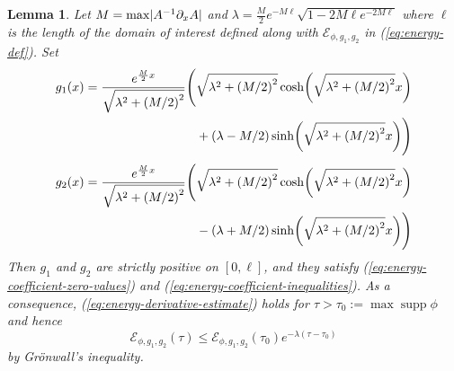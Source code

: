\documentclass[10pt,a4paper]{article}
\theoremstyle{plain}
\newtheorem{lemma}[theorem]{Lemma}
\theoremstyle{definition}
\theoremstyle{remark}
\numberwithin{equation}{section}
\DeclarePairedDelimiter\parentheses{\lparen}{\rparen} %
\DeclarePairedDelimiter\abs{\lvert}{\rvert} %
\newcommand{\supp}{\operatorname{supp}}
\begin{document}
\begin{lemma}\label{gronw-lemma}
  Let $M = \max \abs{A^{-1} \partial_x A}$ and $\lambda = \tfrac{M}{2} e^{-M \ell} \sqrt{1 - 2 M \ell e^{-2 M \ell}}$ where $\ell$ is the length of the domain of interest defined along with $\mathscr{E}_{\phi,g_1,g_2}$ in (\ref{eq:energy-def}). Set
  \begin{align}
    g_1(x) = \frac{e^{\frac{M}{2} x}}{\sqrt{\lambda^2 + \parentheses*{M/2}^2}}
    \Bigg(& \sqrt{\lambda^2 + \parentheses*{M/2}^2} \cosh \parentheses*{\sqrt{\lambda^2 + \parentheses*{M/2}^2} x} \\
          & + \parentheses*{\lambda - M/2} \sinh \parentheses*{\sqrt{\lambda^2 + \parentheses*{M/2}^2} x} \Bigg)
  \end{align}
  \begin{align}
    g_2(x) = \frac{e^{\frac{M}{2} x}}{\sqrt{\lambda^2 + \parentheses*{M/2}^2}}
    \Bigg(& \sqrt{\lambda^2 + \parentheses*{M/2}^2} \cosh \parentheses*{\sqrt{\lambda^2 + \parentheses*{M/2}^2} x} \\
          & - \parentheses*{\lambda + M/2} \sinh \parentheses*{\sqrt{\lambda^2 + \parentheses*{M/2}^2} x} \Bigg)
  \end{align}
  Then $g_1$ and $g_2$ are strictly %
  positive on $[0,\ell]$, and they satisfy (\ref{eq:energy-coefficient-zero-values}) and (\ref{eq:energy-coefficient-inequalities}). 
  As a consequence, (\ref{eq:energy-derivative-estimate}) holds for $\tau >  \tau_0:= \max \supp  \phi $ and hence
    \begin{equation}
    \label{eq:energy-local-decay}
    \mathscr{E}_{\phi,g_1,g_2}(\tau) \leq \mathscr{E}_{\phi,g_1,g_2}(\tau_0) e^{-\lambda (\tau-\tau_0)}
  \end{equation}
  by Gr\"onwall's inequality. 


\end{lemma}
\end{document}
